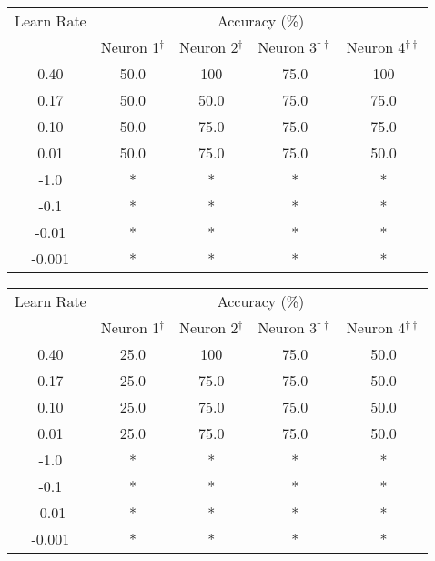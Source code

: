 \documentclass{article}
\begin{document}
\begin{minipage}{\linewidth}
	\centering
	\begin{tabular}{c|cccc}\label{T2}
		Learn Rate      & \multicolumn{4}{c}{Accuracy (\%)} \\
		& Neuron 1$^{\dagger}$ 	& Neuron 2$^{\dagger}$ 	& Neuron 3$^{\dagger\dagger}$ 	& Neuron 4$^{\dagger\dagger}$ \\
		\hline
		0.40			& 50.0   	& 100	  	& 75.0		& 100  \\
		0.17			& 50.0		& 50.0		& 75.0		& 75.0 \\
		0.10			& 50.0		& 75.0		& 75.0		& 75.0 \\
		0.01			& 50.0		& 75.0		& 75.0		& 50.0 \\
		-1.0			& *			& *			& *			& *	   \\
		-0.1			& *			& *			& *			& *	   \\
		-0.01			& *			& *			& *			& *	   \\
		-0.001			& *			& *			& *			& *	   \\
	\end{tabular}
\linebreak
\linebreak
	\begin{tabular}{c|cccc}\label{T3}
		Learn Rate      & \multicolumn{4}{c}{Accuracy (\%)} \\
		& Neuron 1$^{\dagger}$ 	& Neuron 2$^{\dagger}$ 	& Neuron 3$^{\dagger\dagger}$ 	& Neuron 4$^{\dagger\dagger}$ \\
		\hline
		0.40			& 25.0   	& 100	  	& 75.0		& 50.0 \\
		0.17			& 25.0		& 75.0		& 75.0		& 50.0 \\
		0.10			& 25.0		& 75.0		& 75.0		& 50.0 \\
		0.01			& 25.0		& 75.0		& 75.0		& 50.0 \\
		-1.0			& *			& *			& *			& *	   \\
		-0.1			& *			& *			& *			& *	   \\
		-0.01			& *			& *			& *			& *	   \\
		-0.001			& *			& *			& *			& *	   \\
	\end{tabular}
\linebreak
\linebreak

\end{minipage}
\end{document}
